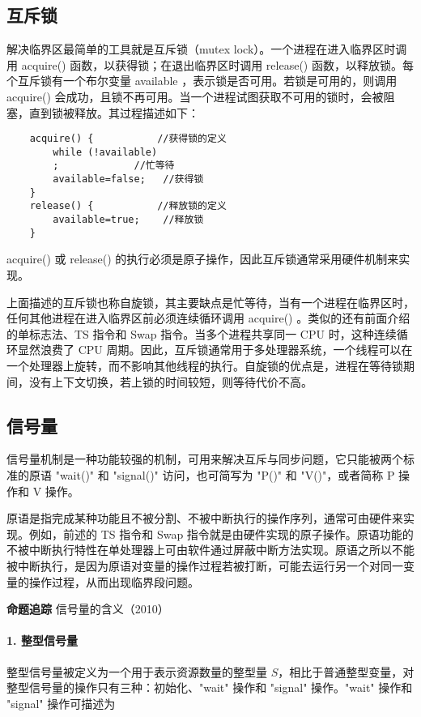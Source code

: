 \documentclass{ctexbook}
\begin{document}
	\subsection{互斥锁}
	
	解决临界区最简单的工具就是互斥锁（mutex lock）。一个进程在进入临界区时调用 acquire() 函数，以获得锁；在退出临界区时调用 release() 函数，以释放锁。每个互斥锁有一个布尔变量 available ，表示锁是否可用。若锁是可用的，则调用 acquire() 会成功，且锁不再可用。当一个进程试图获取不可用的锁时，会被阻塞，直到锁被释放。其过程描述如下：
	\begin{lstlisting}
	acquire() {           //获得锁的定义
		while (!available)
		;             //忙等待
		available=false;   //获得锁
	}
	release() {           //释放锁的定义
		available=true;    //释放锁
	}
\end{lstlisting}

	acquire() 或 release() 的执行必须是原子操作，因此互斥锁通常采用硬件机制来实现。
	
	上面描述的互斥锁也称自旋锁，其主要缺点是忙等待，当有一个进程在临界区时，任何其他进程在进入临界区前必须连续循环调用 acquire() 。类似的还有前面介绍的单标志法、TS 指令和 Swap 指令。当多个进程共享同一 CPU 时，这种连续循环显然浪费了 CPU 周期。因此，互斥锁通常用于多处理器系统，一个线程可以在一个处理器上旋转，而不影响其他线程的执行。自旋锁的优点是，进程在等待锁期间，没有上下文切换，若上锁的时间较短，则等待代价不高。
	
	\subsection{信号量}
	
	信号量机制是一种功能较强的机制，可用来解决互斥与同步问题，它只能被两个标准的原语 "wait()" 和 "signal()" 访问，也可简写为 "P()" 和 "V()"，或者简称 P 操作和 V 操作。
	
	原语是指完成某种功能且不被分割、不被中断执行的操作序列，通常可由硬件来实现。例如，前述的 TS 指令和 Swap 指令就是由硬件实现的原子操作。原语功能的不被中断执行特性在单处理器上可由软件通过屏蔽中断方法实现。原语之所以不能被中断执行，是因为原语对变量的操作过程若被打断，可能去运行另一个对同一变量的操作过程，从而出现临界段问题。
	
	\textbf{命题追踪} 信号量的含义（2010）
	
	\paragraph{1. 整型信号量}
	
	整型信号量被定义为一个用于表示资源数量的整型量 $S$，相比于普通整型变量，对整型信号量的操作只有三种：初始化、"wait" 操作和 "signal" 操作。"wait" 操作和 "signal" 操作可描述为
	
\end{document}
